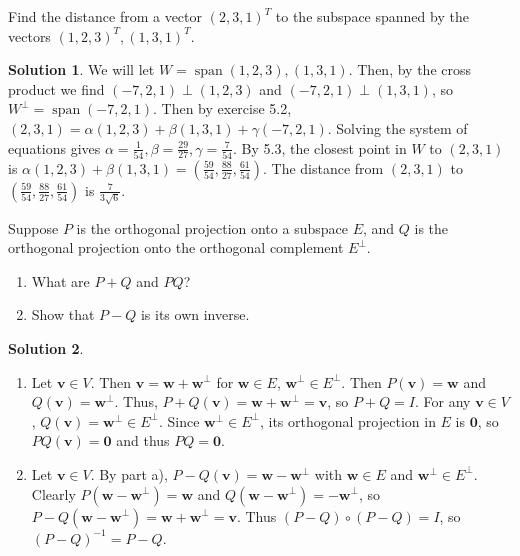 \documentclass[11pt]{article}
\theoremstyle{definition}
\newenvironment{customex}[1]
  {\renewcommand\theinnercustomex{#1}\innercustomex}
  {\endinnercustomex}
\newtheorem*{solution}{Solution}
\DeclareMathOperator{\spn}{span}
\newcommand{\vv}{\mathbf{v}}
\newcommand{\vw}{\mathbf{w}}
\newcommand{\vzero}{\mathbf{0}}
\begin{document}
    \begin{customex}{5.3.4}
        Find the distance from a vector $(2,3,1)^T$ to the subspace spanned by the vectors $(1, 2, 3)^T , (1, 3, 1)^T$.
    \end{customex} 

    \begin{solution}
        We will let $W = \spn (1, 2, 3), (1, 3, 1)$. Then, by the cross product we find $(-7,2,1) \perp (1, 2, 3)$ and $(-7,2,1) \perp  (1, 3, 1)$, so $W^{\perp} = \spn(-7,2,1)$. Then by exercise 5.2, $(2,3,1) = \alpha(1,2,3) + \beta(1,3,1) + \gamma(-7,2,1)$. Solving the system of equations gives $\alpha = \frac{1}{54}, \beta = \frac{29}{27}, \gamma = \frac{7}{54}$. By 5.3, the closest point in $W$ to $(2,3,1)$ is $\alpha(1,2,3) + \beta(1,3,1) = (\frac{59}{54},\frac{88}{27}, \frac{61}{54})$. The distance from $(2,3,1)$ to $(\frac{59}{54},\frac{88}{27}, \frac{61}{54})$ is $\frac{7}{3\sqrt{6}}$.
    \end{solution}

    \begin{customex}{5.3.13}
        Suppose $P$ is the orthogonal projection onto a subspace $E$, and $Q$ is the orthogonal projection onto the orthogonal complement $E^{\perp}$.
        \begin{enumerate}[label=\alph*)]
            \item What are $P + Q$ and $PQ$?
            \item Show that $P - Q$ is its own inverse.
        \end{enumerate}
    \end{customex}

    \begin{solution}
        \begin{enumerate}
            \item Let $\vv \in V$. Then $\vv = \vw + \vw^{\perp}$ for $\vw \in E$, $\vw^{\perp} \in E^{\perp}$. Then $P(\vv) = \vw$ and $Q(\vv) = \vw^{\perp}$. Thus, $P+Q(\vv) = \vw + \vw^{\perp} = \vv$, so $P+Q = I$. For any $\vv \in V$, $Q(\vv)  = \vw^{\perp}\in E^{\perp}$. Since $\vw^{\perp} \in E^{\perp}$, its orthogonal projection in $E$ is $\vzero$, so $PQ(\vv) = \vzero$ and thus $PQ = \vzero$.
            \item Let $\vv \in V$. By part a), $P-Q(\vv) = \vw - \vw^{\perp}$ with $\vw \in E$ and $\vw^{\perp} \in E^{\perp}$. Clearly $P(\vw - \vw^{\perp}) = \vw$ and $Q(\vw - \vw^{\perp}) = -\vw^{\perp}$, so $P-Q(\vw - \vw^{\perp}) = \vw + \vw^{\perp} = \vv$. Thus $(P-Q) \circ (P-Q) = I$, so $(P-Q)^{-1} = P-Q$. 
        \end{enumerate}
    \end{solution}
\end{document}
